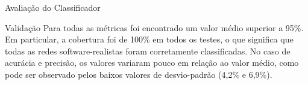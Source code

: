\begin{section}{Avaliação do Classificador}
\begin{subsection}{Validação}
		Para todas as métricas foi encontrado um valor médio superior a 95\%. Em particular, a cobertura foi de 100\% em todos os testes, o que significa que todas as redes software-realistas foram corretamente classificadas. No caso de acurácia e precisão, os valores variaram pouco em relação ao valor médio, como pode ser observado pelos baixos valores de desvio-padrão (4,2\% e 6,9\%).

		

\end{subsection}	
\end{section}

